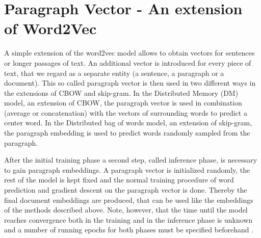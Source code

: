 \documentclass[Thesis.tex]{subfiles}
\begin{document}
\section{Paragraph Vector - An extension of Word2Vec}

A simple extension of the word2vec model allows to obtain vectors
for sentences or longer passages of text. An additional vector is
introduced for every piece of text, that we regard as a separate entity
(a sentence, a paragraph or a document). This so called paragraph
vector is then used in two different ways in the extensions of CBOW
and skip-gram. In the Distributed Memory (DM) model, an extension
of CBOW, the paragraph vector is used in combination (average or concatenation)
with the vectors of surrounding words to predict a center word. In
the Distributed bag of words model, an extension of skip-gram, the
paragraph embedding is used to predict words randomly sampled from
the paragraph.

After the initial training phase a second step, called inference phase, is necessary to gain paragraph embeddings. A paragraph vector is initialized randomly, the rest of the model is kept fixed and the normal training procedure of word prediction and gradient descent on the paragraph vector is done. Thereby the final document embeddings are produced, that can be used like the embeddings of the methods described above. Note, however, that the time until the model reaches convergence both in the training and in the inference phase is unknown and a number of running epochs for both phases must be specified beforehand \citep{Le2014}.
\end{document}
